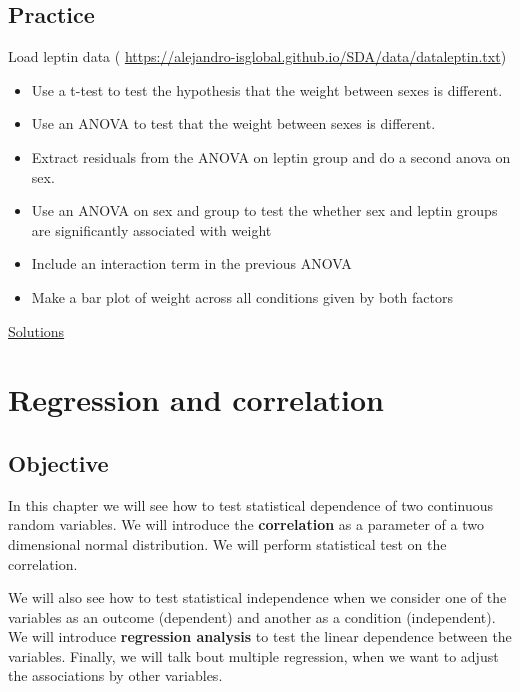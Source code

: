 \documentclass[
]{book}
\begin{document}
\hypertarget{practice-7}{%
\section{Practice}\label{practice-7}}

Load leptin data (
\url{https://alejandro-isglobal.github.io/SDA/data/dataleptin.txt})

\begin{itemize}
\item
  Use a t-test to test the hypothesis that the weight between sexes is different.
\item
  Use an ANOVA to test that the weight between sexes is different.
\item
  Extract residuals from the ANOVA on leptin group and do a second anova on sex.
\item
  Use an ANOVA on sex and group to test the whether sex and leptin groups are significantly associated with weight
\item
  Include an interaction term in the previous ANOVA
\item
  Make a bar plot of weight across all conditions given by both factors
\end{itemize}

\href{https://colab.research.google.com/drive/1K2SlNEd5hNn3lI4XnKsgj1tDeXVyprVE?usp=sharing}{Solutions}

\hypertarget{regression-and-correlation}{%
\chapter{Regression and correlation}\label{regression-and-correlation}}

\hypertarget{objective-13}{%
\section{Objective}\label{objective-13}}

In this chapter we will see how to test statistical dependence of two continuous random variables. We will introduce the \textbf{correlation} as a parameter of a two dimensional normal distribution. We will perform statistical test on the correlation.

We will also see how to test statistical independence when we consider one of the variables as an outcome (dependent) and another as a condition (independent). We will introduce \textbf{regression analysis} to test the linear dependence between the variables. Finally, we will talk bout multiple regression, when we want to adjust the associations by other variables.
\end{document}
